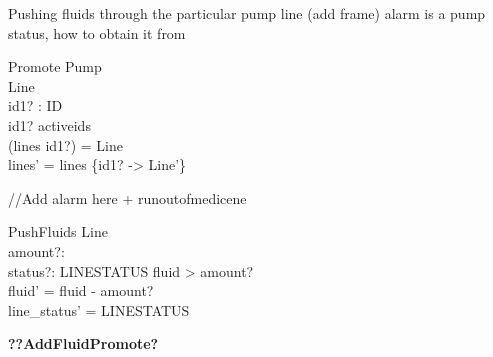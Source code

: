 \documentclass{article}
\begin{document}
	
	Pushing fluids through the particular pump line (add frame) alarm is a pump status, how to obtain it from
	
	\begin{schema}{Promote}
		\Delta Pump	\\
		\Delta Line \\
		id1? : ID \\
	\where 
		id1? \in activeids \\
		(lines id1?) = \theta Line \\
		lines' = lines \oplus \{id1? -> \theta Line'\} \\		
	\end{schema}
	
	//Add alarm here + runoutofmedicene
	\begin{schema}{PushFluids}
		\Delta Line \\
		amount?: \nat \\
		status?: LINESTATUS
	\where 
		fluid > amount? \\
		fluid' = fluid - amount? \\
		line_status' = LINESTATUS
	\end{schema}
	
	\textbf{??AddFluidPromote?}
\end{document}
